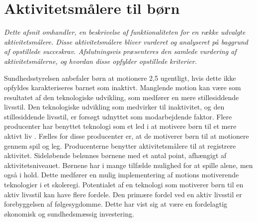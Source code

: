 \newpage
\section{Aktivitetsmålere til børn} \label{tracker_intro}
\textit{Dette afsnit omhandler, en beskrivelse af funktionaliteten for en række udvalgte aktivitetsmålere. Disse aktivitetsmålere bliver vurderet og analyseret på baggrund af opstillede succeskrav. Afslutningsvis præsenteres den samlede vurdering af aktivitetsmålerne, og hvordan disse opfylder opstillede kriterier.}


Sundhedsstyrelsen anbefaler børn at motionere 2,5 ugentligt, hvis dette ikke opfyldes karakteriseres barnet som inaktivt. Manglende motion kan være som resultatet af den teknologiske udvikling, som medfører en mere stillesiddende livsstil. \citep{ObesityActionCoalition} Den teknologiske udvikling som medvirker til inaktivitet, og den stillesiddende livsstil, er forsøgt udnyttet som modarbejdende faktor. Flere producenter har benyttet teknologi som et led i at motivere børn til et mere aktivt liv \citep{Fuhu2015,PowerAbout2015}. Fælles for disse producenter er, at de motiverer børn til at motionere gennem spil og leg. Producenterne benytter aktivitetsmålere til at registrere aktivitet. Sideløbende belønnes børnene med et antal point, afhængigt af aktivitetsniveauet. Børnene har i mange tilfælde mulighed for at spille alene, men også i hold. Dette medfører en mulig implementering af motions motiverende teknologier i et skoleregi. \newline
Potentialet af en teknologi som motiverer børn til en aktiv livsstil kan have flere fordele. Den primære fordel ved en aktiv livsstil er forebyggelsen af følgesygdomme. Dette har vist sig at være en fordelagtig økonomisk og sundhedsmæssig investering.


